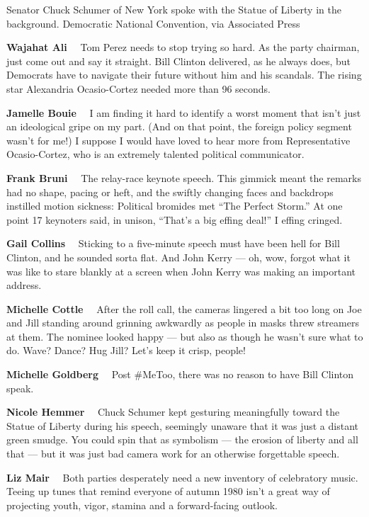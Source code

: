 Senator Chuck Schumer of New York spoke with the Statue of Liberty in
the background. Democratic National Convention, via Associated Press

\textbf{Wajahat Ali}~~ Tom Perez needs to stop trying so hard. As the
party chairman, just come out and say it straight. Bill Clinton
delivered, as he always does, but Democrats have to navigate their
future without him and his scandals. The rising star Alexandria
Ocasio-Cortez needed more than 96 seconds.

\textbf{Jamelle Bouie}~~ I am finding it hard to identify a worst moment
that isn't just an ideological gripe on my part. (And on that point, the
foreign policy segment wasn't for me!) I suppose I would have loved to
hear more from Representative Ocasio-Cortez, who is an extremely
talented political communicator.

\textbf{Frank Bruni}~~ The relay-race keynote speech. This gimmick meant
the remarks had no shape, pacing or heft, and the swiftly changing faces
and backdrops instilled motion sickness: Political bromides met ``The
Perfect Storm.'' At one point 17 keynoters said, in unison, ``That's a
big effing deal!'' I effing cringed.

\textbf{Gail Collins}~~ Sticking to a five-minute speech must have been
hell for Bill Clinton, and he sounded sorta flat. And John Kerry --- oh,
wow, forgot what it was like to stare blankly at a screen when John
Kerry was making an important address.

\textbf{Michelle Cottle}~~ After the roll call, the cameras lingered a
bit too long on Joe and Jill standing around grinning awkwardly as
people in masks threw streamers at them. The nominee looked happy ---
but also as though he wasn't sure what to do. Wave? Dance? Hug Jill?
Let's keep it crisp, people!

\textbf{Michelle Goldberg}~~ Post \#MeToo, there was no reason to have
Bill Clinton speak.

\textbf{Nicole Hemmer}~~ Chuck Schumer kept gesturing meaningfully
toward the Statue of Liberty during his speech, seemingly unaware that
it was just a distant green smudge. You could spin that as symbolism ---
the erosion of liberty and all that --- but it was just bad camera work
for an otherwise forgettable speech.

\textbf{Liz Mair}~~ Both parties desperately need a new inventory of
celebratory music. Teeing up tunes that remind everyone of autumn 1980
isn't a great way of projecting youth, vigor, stamina and a
forward-facing outlook.

